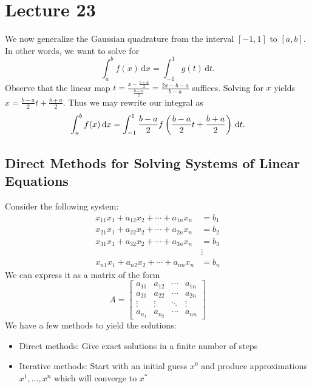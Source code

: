 \documentclass[class=article, crop=false]{standalone}
\begin{document}
  \section{Lecture 23}
  We now generalize the Gaussian quadrature from the interval $[-1, 1]$ to $[a, b]$. In other words, we want to solve for
  \[
    \int_{a}^{b}f(x) \,\mathrm dx = \int_{-1}^{1}g(t) \,\mathrm dt.
  \]
  Observe that the linear map $t = \frac{x - \frac{b + a}{2}}{\frac{b - a}{2}} = \frac{2x - b - a}{b - a}$ suffices. Solving for $x$ yields $x = \frac{b - a}{2}t + \frac{b + a}{2}$. Thus we may rewrite our integral as
  \[
    \int_{a}^{b}f(x) \,\mathrm dx = \int_{-1}^{1}\frac{b - a}{2}f\left( \frac{b - a}{2}t + \frac{b + a}{2} \right) \,\mathrm dt.
  \]
  \subsection{Direct Methods for Solving Systems of Linear Equations}
  Consider the following system:
  \begin{align*}
    x_{11}x_1 + a_{12}x_2 + \dotsb + a_{1n}x_n &= b_1 \\
    x_{21}x_1 + a_{22}x_2 + \dotsb + a_{2n}x_n &= b_2 \\
    x_{31}x_1 + a_{32}x_2 + \dotsb + a_{3n}x_n &= b_3 \\
                                               &\vdots \\
    x_{n1}x_1 + a_{n2}x_2 + \dotsb + a_{nn}x_n &= b_n
  \end{align*}
  We can express it as a matrix of the form
  \[
    A = \begin{bmatrix}
      a_{11} & a_{12} & \dotsb & a_{1n} \\
      a_{21} & a_{22} & \dotsb & a_{2n} \\
      \vdots & \vdots & \ddots & \vdots \\
      a_{n_1} & a_{n_2} & \dotsb & a_{nn}
    \end{bmatrix}
  \]
  We have a few methods to yield the solutions:
  \begin{itemize}
    \item Direct methods: Give exact solutions in a finite number of steps
    \item Iterative methods: Start with an initial guess $x^0$ and produce approximations $x^1,\dotsc,x^n$ which will converge to $x^*$
  \end{itemize}
\end{document}
